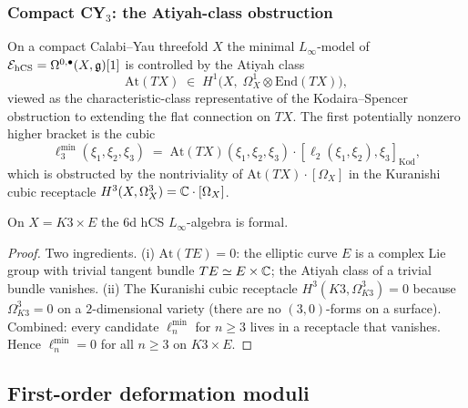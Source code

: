 \subsubsection{Compact CY$_3$: the Atiyah-class obstruction}

\begin{theorem}\ClaimStatusTheorem
\label{opus13:thm:atiyah}
On a compact Calabi--Yau threefold $X$ the minimal $L_\infty$-model of
$\mathcal{E}_{\mathrm{hCS}} = \Omega^{0,\bullet}(X,\mathfrak{g})[1]$ is controlled by the Atiyah
class
\[
  \mathrm{At}(TX) \;\in\; H^1\bigl(X,\; \Omega^1_X \otimes \mathrm{End}(TX)\bigr),
\]
viewed as the characteristic-class representative of the
Kodaira--Spencer obstruction to extending the flat connection on $TX$.
The first potentially nonzero higher bracket is the cubic
\begin{equation}
  \ell_3^{\min}(\xi_1,\xi_2,\xi_3) \;=\; \mathrm{At}(TX)(\xi_1,\xi_2,\xi_3)
  \cdot [\ell_2(\xi_1,\xi_2), \xi_3]_{\mathrm{Kod}},
  \label{opus13:eq:ell-3-atiyah}
\end{equation}
which is obstructed by the nontriviality of
$\mathrm{At}(TX)\cdot[\Omega_X]$ in the Kuranishi cubic receptacle
$H^3(X, \Omega^3_X) = \mathbb{C}\cdot [\Omega_X]$.
\end{theorem}

\begin{corollary}\ClaimStatusCorollary
\label{opus13:cor:k3e-formal}
On $X = K3\times E$ the 6d hCS $L_\infty$-algebra is formal.
\end{corollary}

\begin{proof}
Two ingredients.
(i) $\mathrm{At}(TE) = 0$: the elliptic curve $E$ is a complex Lie group
with trivial tangent bundle $TE \simeq E\times\mathbb{C}$; the Atiyah class of
a trivial bundle vanishes.
(ii) The Kuranishi cubic receptacle $H^3(K3,\Omega^3_{K3}) = 0$ because
$\Omega^3_{K3} = 0$ on a $2$-dimensional variety (there are no
$(3,0)$-forms on a surface).
Combined: every candidate $\ell_n^{\min}$ for $n\geq 3$ lives in a
receptacle that vanishes. Hence $\ell_n^{\min} = 0$ for all $n\geq 3$
on $K3\times E$.
\end{proof}


\subsection{First-order deformation moduli}
\label{opus13:subsec:deformations}

